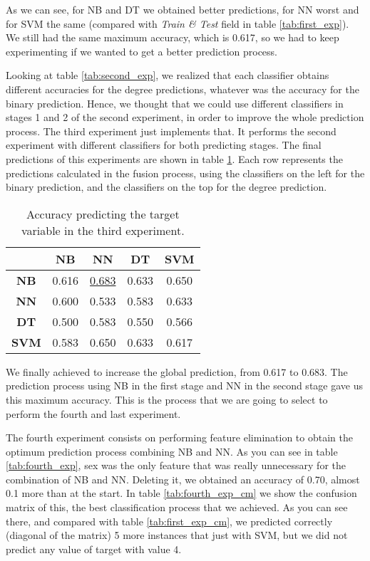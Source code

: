 As we can see, for NB and DT we obtained better predictions, for NN worst and for SVM the same (compared with \textit{Train \& Test} field in table \ref{tab:first_exp}). We still had the same maximum accuracy, which is 0.617, so we had to keep experimenting if we wanted to get a better prediction process.

Looking at table \ref{tab:second_exp}, we realized that each classifier obtains different accuracies for the degree predictions, whatever was the accuracy for the binary prediction. Hence, we thought that we could use different classifiers in stages 1 and 2 of the second experiment, in order to improve the whole prediction process. The third experiment just implements that. It performs the second experiment with different classifiers for both predicting stages. The final predictions of this experiments are shown in table \ref{tab:third_exp}. Each row represents the predictions calculated in the fusion process, using the classifiers on the left for the binary prediction, and the classifiers on the top for the degree prediction.

\begin{table}[hbtp]
    \centering
    \begin{tabular}{c c c c c}
        \toprule
         & \textbf{NB} & \textbf{NN} & \textbf{DT} & \textbf{SVM} \\ \midrule
        \textbf{NB} & 0.616 & \underline{0.683} & 0.633 & 0.650 \\
        \textbf{NN} & 0.600 & 0.533 & 0.583 & 0.633 \\
        \textbf{DT} & 0.500 & 0.583 & 0.550 & 0.566 \\
        \textbf{SVM} & 0.583 & 0.650 & 0.633 & 0.617 \\
        \bottomrule
    \end{tabular}
    \caption{Accuracy predicting the target variable in the third experiment.}
    \label{tab:third_exp}
\end{table}

We finally achieved to increase the global prediction, from 0.617 to 0.683. The prediction process using NB in the first stage and NN in the second stage gave us this maximum accuracy. This is the process that we are going to select to perform the fourth and last experiment.

The fourth experiment consists on performing feature elimination to obtain the optimum prediction process combining NB and NN. As you can see in table \ref{tab:fourth_exp}, sex was the only feature that was really unnecessary for the combination of NB and NN. Deleting it, we obtained an accuracy of 0.70, almost 0.1 more than at the start. In table \ref{tab:fourth_exp_cm} we show the confusion matrix of this, the best classification process that we achieved. As you can see there, and compared with table \ref{tab:first_exp_cm}, we predicted correctly (diagonal of the matrix) 5 more instances that just with SVM, but we did not predict any value of target with value 4.


